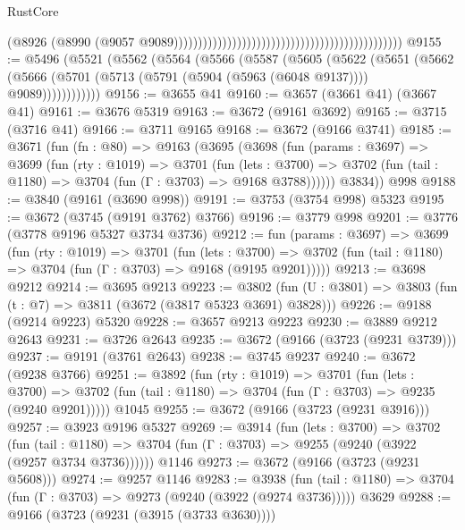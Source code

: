 \begin{lexlean}{RustCore}
\begin{coremodule}
                                                                                            (@8926
                                                                                              (@8990
                                                                                                (@9057
                                                                                                  @9089)))))))))))))))))))))))))))))))))))))))))))))))
@9155 := @5496
    (@5521
      (@5562
        (@5564
          (@5566
            (@5587
              (@5605
                (@5622
                  (@5651
                    (@5662
                      (@5666 (@5701 (@5713 (@5791 (@5904 (@5963 (@6048 @9137)))) @9089))))))))))))
@9156 := @3655 @41
@9160 := @3657 (@3661 @41) (@3667 @41)
@9161 := @3676 @5319
@9163 := @3672 (@9161 @3692)
@9165 := @3715 (@3716 @41)
@9166 := @3711 @9165
@9168 := @3672 (@9166 @3741)
@9185 := @3671
    (fun (fn : @80) =>
    @9163
      (@3695
        (@3698
          (fun (params : @3697) =>
          @3699
            (fun (rty : @1019) =>
            @3701
              (fun (lets : @3700) =>
              @3702 (fun (tail : @1180) => @3704 (fun (Γ : @3703) => @9168 @3788))))))
        @3834))
    @998
@9188 := @3840 (@9161 (@3690 @998))
@9191 := @3753 (@3754 @998) @5323
@9195 := @3672 (@3745 (@9191 @3762) @3766)
@9196 := @3779 @998
@9201 := @3776 (@3778 @9196 @5327 @3734 @3736)
@9212 := fun (params : @3697) =>
  @3699
    (fun (rty : @1019) =>
    @3701
      (fun (lets : @3700) =>
      @3702 (fun (tail : @1180) => @3704 (fun (Γ : @3703) => @9168 (@9195 @9201)))))
@9213 := @3698 @9212
@9214 := @3695 @9213
@9223 := @3802 (fun (U : @3801) => @3803 (fun (t : @7) => @3811 (@3672 (@3817 @5323 @3691) @3828)))
@9226 := @9188 (@9214 @9223) @5320
@9228 := @3657 @9213 @9223
@9230 := @3889 @9212 @2643
@9231 := @3726 @2643
@9235 := @3672 (@9166 (@3723 (@9231 @3739)))
@9237 := @9191 (@3761 @2643)
@9238 := @3745 @9237
@9240 := @3672 (@9238 @3766)
@9251 := @3892
    (fun (rty : @1019) =>
    @3701
      (fun (lets : @3700) =>
      @3702 (fun (tail : @1180) => @3704 (fun (Γ : @3703) => @9235 (@9240 @9201)))))
    @1045
@9255 := @3672 (@9166 (@3723 (@9231 @3916)))
@9257 := @3923 @9196 @5327
@9269 := @3914
    (fun (lets : @3700) =>
    @3702
      (fun (tail : @1180) => @3704 (fun (Γ : @3703) => @9255 (@9240 (@3922 (@9257 @3734 @3736))))))
    @1146
@9273 := @3672 (@9166 (@3723 (@9231 @5608)))
@9274 := @9257 @1146
@9283 := @3938
    (fun (tail : @1180) => @3704 (fun (Γ : @3703) => @9273 (@9240 (@3922 (@9274 @3736)))))
    @3629
@9288 := @9166 (@3723 (@9231 (@3915 (@3733 @3630))))

\end{coremodule}
\end{lexlean}
